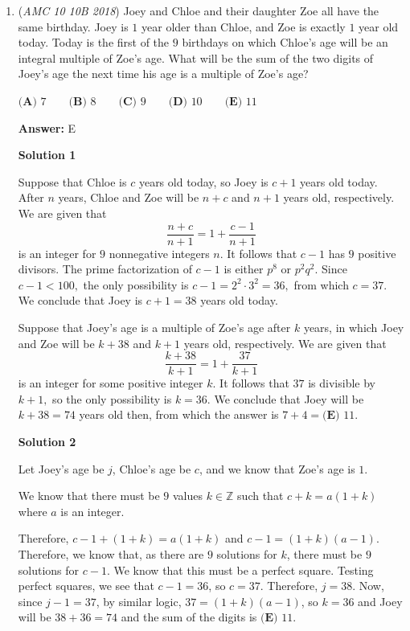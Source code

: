 \begin{enumerate}
 


 \textbf{Remarks} A key insight to solve this problem is to realize that one of the brother-sister pairs needs to be a "opposites" (ex. top left and bottom right or top right and bottom left). Using this, you can easily solve the question. 

 


	\item (\textit{AMC 10 10B 2018}) Joey and Chloe and their daughter Zoe all have the same birthday. Joey is $1$ year older than Chloe, and Zoe is exactly $1$ year old today. Today is the first of the $9$ birthdays on which Chloe's age will be an integral multiple of Zoe's age. What will be the sum of the two digits of Joey's age the next time his age is a multiple of Zoe's age?


 $\textbf{(A) }7 \qquad \textbf{(B) }8 \qquad \textbf{(C) }9 \qquad \textbf{(D) }10 \qquad \textbf{(E) }11 \qquad$

 \textbf{Answer: }E



\textbf{Solution 1}

Suppose that Chloe is $c$ years old today, so Joey is $c+1$ years old today. After $n$ years, Chloe and Zoe will be $n+c$ and $n+1$ years old, respectively. We are given that 
 \[\frac{n+c}{n+1}=1+\frac{c-1}{n+1}\] is an integer for $9$ nonnegative integers $n.$ It follows that $c-1$ has $9$ positive divisors. The prime factorization of $c-1$ is either $p^8$ or $p^2q^2.$ Since $c-1<100,$ the only possibility is $c-1=2^2\cdot3^2=36,$ from which $c=37.$ We conclude that Joey is $c+1=38$ years old today.

 Suppose that Joey's age is a multiple of Zoe's age after $k$ years, in which Joey and Zoe will be $k+38$ and $k+1$ years old, respectively. We are given that 
 \[\frac{k+38}{k+1}=1+\frac{37}{k+1}\] is an integer for some positive integer $k.$ It follows that $37$ is divisible by $k+1,$ so the only possibility is $k=36.$ We conclude that Joey will be $k+38=74$ years old then, from which the answer is $7+4=\boxed{\textbf{(E) }11}.$




\textbf{Solution 2}

Let Joey's age be $j$, Chloe's age be $c$, and we know that Zoe's age is $1$. 

 We know that there must be $9$ values $k\in\mathbb{Z}$ such that $c+k=a(1+k)$ where $a$ is an integer.

 Therefore, $c-1+(1+k)=a(1+k)$ and $c-1=(1+k)(a-1)$. Therefore, we know that, as there are $9$ solutions for $k$, there must be $9$ solutions for $c-1$. We know that this must be a perfect square. Testing perfect squares, we see that $c-1=36$, so $c=37$. Therefore, $j=38$. Now, since $j-1=37$, by similar logic, $37=(1+k)(a-1)$, so $k=36$ and Joey will be $38+36=74$ and the sum of the digits is $\boxed{\textbf{(E) }11}$.


\end{enumerate}
